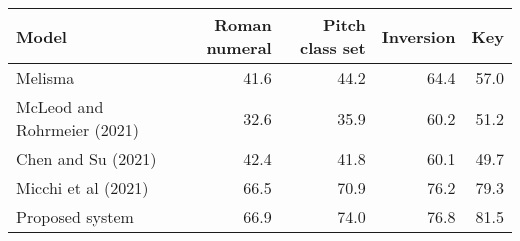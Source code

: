 \begin{tabular}{l|rrrr}
Model                       & Roman numeral & Pitch class set & Inversion & Key  \\
\hline
Melisma                     & 41.6          & 44.2            & 64.4      & 57.0 \\
McLeod and Rohrmeier (2021) & 32.6          & 35.9            & 60.2      & 51.2 \\
Chen and Su (2021)          & 42.4          & 41.8            & 60.1      & 49.7 \\
Micchi et al (2021)         & 66.5          & 70.9            & 76.2      & 79.3 \\
Proposed system             & 66.9          & 74.0            & 76.8      & 81.5
\end{tabular}
